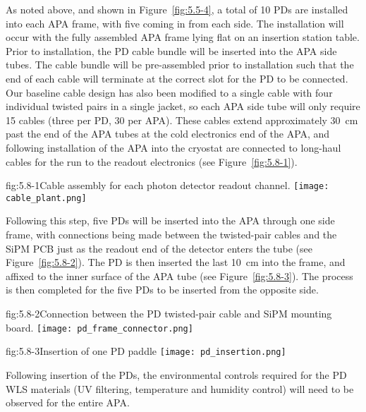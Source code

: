 As noted above, and shown in Figure~\ref{fig:5.5-4}, a total of 10 PDs are
installed into each APA frame, with five coming in from each side.  The
installation will occur with the fully assembled APA frame lying flat
on an insertion station table.  Prior to installation, the PD cable
bundle will be inserted into the APA side tubes.  The cable bundle
will be pre-assembled prior to installation such that the end of each
cable will terminate at the correct slot for the PD to be connected.
Our baseline \fixme{} cable design has also been modified to a single cable
with four individual twisted pairs in a single jacket, so each APA side
tube will only require 15 cables (three per PD, 30 per APA).  These cables
extend approximately 30~cm past the end of the APA tubes at the cold
electronics end of the APA, and following installation of the APA into
the cryostat are connected to long-haul cables for the run to the
readout electronics (see Figure~\ref{fig:5.8-1}).

\begin{cdrfigure}{fig:5.8-1}{Cable assembly for each photon detector
    readout channel.}  
  \texttt{[image: cable\_plant.png]}
\end{cdrfigure}

Following this step, five PDs will be inserted into the APA through one
side frame, with connections being made between the twisted-pair
cables and the SiPM PCB just as the readout end of the detector enters
the tube (see Figure~\ref{fig:5.8-2}).  The PD is then inserted the last 10~cm into
the frame, and affixed to the inner surface of the APA tube (see
Figure~\ref{fig:5.8-3}).  The process is then completed for the five PDs to be
inserted from the opposite side.

\begin{cdrfigure}{fig:5.8-2}{Connection between the PD twisted-pair cable and SiPM mounting board.}
  \texttt{[image: pd\_frame\_connector.png]}
\end{cdrfigure}

\begin{cdrfigure}{fig:5.8-3}{Insertion of one PD paddle}
  \texttt{[image: pd\_insertion.png]} 
\end{cdrfigure}

Following insertion of the PDs, the environmental controls required
for the PD WLS materials (UV filtering, temperature and humidity
control) will need to be observed for the entire APA.






